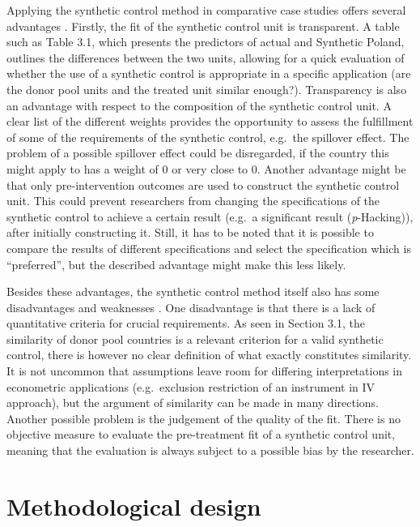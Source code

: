 \documentclass{scrbook}
\begin{document}
Applying the synthetic control method in comparative case studies offers
several advantages \parencite{abadie_using_2021}. Firstly, the fit of
the synthetic control unit is transparent. A table such as Table 3.1,
which presents the predictors of actual and Synthetic Poland, outlines
the differences between the two units, allowing for a quick evaluation
of whether the use of a synthetic control is appropriate in a specific
application (are the donor pool units and the treated unit similar
enough?). Transparency is also an advantage with respect to the
composition of the synthetic control unit. A clear list of the different
weights provides the opportunity to assess the fulfillment of some of
the requirements of the synthetic control, e.g.~the spillover effect.
The problem of a possible spillover effect could be disregarded, if the
country this might apply to has a weight of 0 or very close to 0.
Another advantage might be that only pre-intervention outcomes are used
to construct the synthetic control unit. This could prevent researchers
from changing the specifications of the synthetic control to achieve a
certain result (e.g.~a significant result (\textit{p}-Hacking)), after
initially constructing it. Still, it has to be noted that it is possible
to compare the results of different specifications and select the
specification which is ``preferred'', but the described advantage might
make this less likely.

Besides these advantages, the synthetic control method itself also has
some disadvantages and weaknesses \parencite{bouttell_synthetic_2018}.
One disadvantage is that there is a lack of quantitative criteria for
crucial requirements. As seen in Section 3.1, the similarity of donor
pool countries is a relevant criterion for a valid synthetic control,
there is however no clear definition of what exactly constitutes
similarity. It is not uncommon that assumptions leave room for differing
interpretations in econometric applications (e.g.~exclusion restriction
of an instrument in IV approach), but the argument of similarity can be
made in many directions. Another possible problem is the judgement of
the quality of the fit. There is no objective measure to evaluate the
pre-treatment fit of a synthetic control unit, meaning that the
evaluation is always subject to a possible bias by the researcher.

\section{Methodological design}
\end{document}
